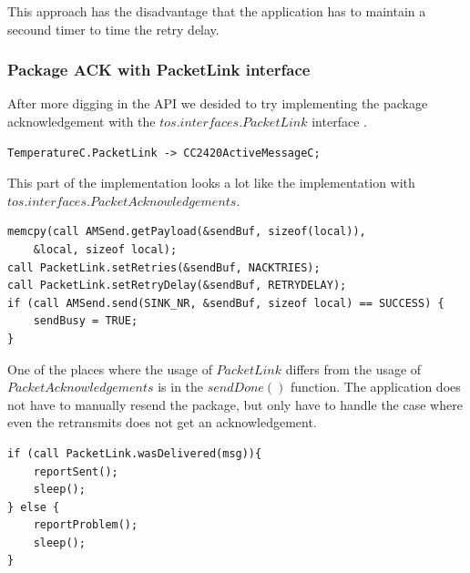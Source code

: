 This approach has the disadvantage that the application has to maintain a
secound timer to time the retry delay.

\subsubsection{Package ACK with PacketLink interface}

After more digging in the API we desided to try implementing the package
acknowledgement with the $tos.interfaces.PacketLink$ interface \cite{telosbAPI}.

\begin{lstlisting}[caption={TemperatureAppC.nc}]
TemperatureC.PacketLink -> CC2420ActiveMessageC;
\end{lstlisting}

This part of the implementation looks a lot like the implementation with
$tos.interfaces.PacketAcknowledgements$.

\begin{lstlisting}[caption={TemperatureC.nc $\rightarrow$ sendReadings()}]
memcpy(call AMSend.getPayload(&sendBuf, sizeof(local)),
    &local, sizeof local);
call PacketLink.setRetries(&sendBuf, NACKTRIES);
call PacketLink.setRetryDelay(&sendBuf, RETRYDELAY);
if (call AMSend.send(SINK_NR, &sendBuf, sizeof local) == SUCCESS) {
    sendBusy = TRUE;
}
\end{lstlisting}

One of the places where the usage of $PacketLink$ differs from the usage of
$PacketAcknowledgements$ is in the $sendDone()$ function. The application does
not have to manually resend the package, but only have to handle the case where
even the retransmits does not get an acknowledgement.

\begin{lstlisting}[caption={TemperatureC.nc $\rightarrow$ AMSend.sendDone()}]
if (call PacketLink.wasDelivered(msg)){
    reportSent();
    sleep();
} else {
    reportProblem();
    sleep();
}
\end{lstlisting}


